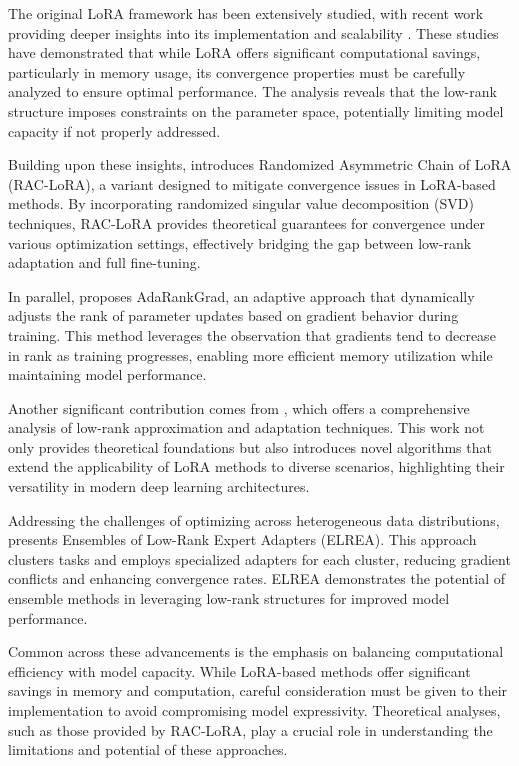 \documentclass[conference]{IEEEtran}
\begin{document}
The original LoRA framework has been extensively studied, with recent work providing deeper insights into its implementation and scalability \cite{bX}. These studies have demonstrated that while LoRA offers significant computational savings, particularly in memory usage, its convergence properties must be carefully analyzed to ensure optimal performance. The analysis reveals that the low-rank structure imposes constraints on the parameter space, potentially limiting model capacity if not properly addressed.

Building upon these insights, \cite{bX} introduces Randomized Asymmetric Chain of LoRA (RAC-LoRA), a variant designed to mitigate convergence issues in LoRA-based methods. By incorporating randomized singular value decomposition (SVD) techniques, RAC-LoRA provides theoretical guarantees for convergence under various optimization settings, effectively bridging the gap between low-rank adaptation and full fine-tuning.

In parallel, \cite{bX} proposes AdaRankGrad, an adaptive approach that dynamically adjusts the rank of parameter updates based on gradient behavior during training. This method leverages the observation that gradients tend to decrease in rank as training progresses, enabling more efficient memory utilization while maintaining model performance.

Another significant contribution comes from \cite{bX}, which offers a comprehensive analysis of low-rank approximation and adaptation techniques. This work not only provides theoretical foundations but also introduces novel algorithms that extend the applicability of LoRA methods to diverse scenarios, highlighting their versatility in modern deep learning architectures.

Addressing the challenges of optimizing across heterogeneous data distributions, \cite{bX} presents Ensembles of Low-Rank Expert Adapters (ELREA). This approach clusters tasks and employs specialized adapters for each cluster, reducing gradient conflicts and enhancing convergence rates. ELREA demonstrates the potential of ensemble methods in leveraging low-rank structures for improved model performance.

Common across these advancements is the emphasis on balancing computational efficiency with model capacity. While LoRA-based methods offer significant savings in memory and computation, careful consideration must be given to their implementation to avoid compromising model expressivity. Theoretical analyses, such as those provided by RAC-LoRA, play a crucial role in understanding the limitations and potential of these approaches.
\end{document}
